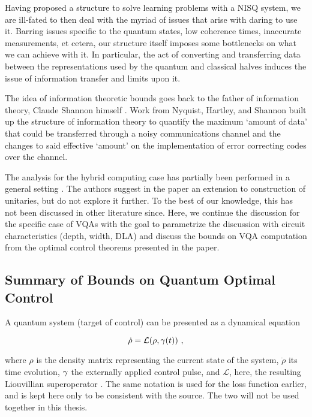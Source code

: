 
Having proposed a structure to solve learning problems with a NISQ system, we
are ill-fated to then deal with the myriad of issues that arise with daring to
use it. Barring issues specific to the quantum states, low coherence times,
inaccurate measurements, et cetera, our structure itself
imposes some bottlenecks on what we can achieve with it. In particular, the act
of converting and transferring data between the representations used by the
quantum and classical halves induces the issue of information transfer and
limits upon it. 

The idea of information theoretic bounds goes back to the father of information
theory, Claude Shannon himself \cite{shannon1948mathematical}. Work from
Nyquist, Hartley, and Shannon \cite{hartley1928transmission} built up the
structure of information theory to quantify the maximum `amount of data' that
could be transferred through a noisy communications channel and the changes to
said effective `amount' on the implementation of error correcting codes over the
channel.

The analysis for the hybrid computing case has partially been performed in a
general setting \cite{lloyd2014information}. The authors suggest in the paper an
extension to construction of unitaries, but do not explore it further. To the
best of our knowledge, this has not been discussed in other literature since.
Here, we continue the discussion for the specific case of VQAs with the goal to
parametrize the discussion with circuit characteristics (depth, width, DLA) and
discuss the bounds on VQA computation from the optimal control theorems
presented in the paper.

\subsection{Summary of Bounds on Quantum Optimal Control}
\label{subsec:qoc}
A quantum system (target of control) can be presented as a dynamical equation

\begin{equation}
    \dot{\rho} = \mathcal{L}(\rho, \gamma(t))~,
\end{equation}

where \(\rho\) is the density matrix representing the current state of the
system, \(\dot{\rho}\) its time evolution, \(\gamma\) the externally
applied control pulse, and \(\mathcal{L}\), here, the resulting Liouvillian
superoperator \cite[see][section IV]{manzano2020lindblad}. The same notation is
used for the loss function earlier, and is kept here only to be consistent with
the source. The two will not be used together in this thesis.

